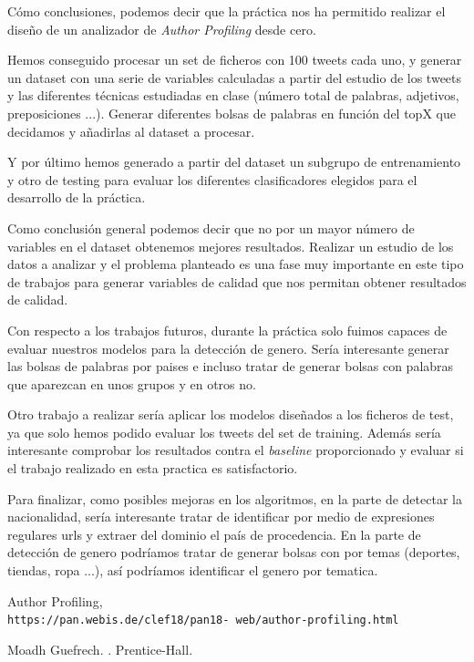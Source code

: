 \documentclass[11pt,a4paper]{article}
\begin{document}
Cómo conclusiones, podemos decir que la práctica nos ha permitido realizar el diseño de un analizador de \textit{Author Profiling} desde cero. 

Hemos conseguido procesar un set de ficheros con 100 tweets cada uno, y generar un dataset con una serie de variables calculadas a partir del estudio de los tweets y las diferentes técnicas estudiadas en clase (número total de palabras, adjetivos, preposiciones ...). Generar diferentes bolsas de palabras en función del topX que decidamos y añadirlas al dataset a procesar. 

Y por último hemos generado a partir del dataset un subgrupo de entrenamiento y otro de testing para evaluar los diferentes clasificadores elegidos para el desarrollo de la práctica.

Como conclusión general podemos decir que no por un mayor número de variables en el dataset obtenemos mejores resultados. Realizar un estudio de los datos a analizar y el problema planteado es una fase muy importante en este tipo de trabajos para generar variables de calidad que nos permitan obtener resultados de calidad.

Con respecto a los trabajos futuros, durante la práctica solo fuimos capaces de evaluar nuestros modelos para la detección de genero. Sería interesante generar las bolsas de palabras por paises e incluso tratar de generar bolsas con palabras que aparezcan en unos grupos y en otros no.

Otro trabajo a realizar sería aplicar los modelos diseñados a los ficheros de test, ya que solo hemos podido evaluar los tweets del set de training. Además sería interesante comprobar los resultados contra el \textit{baseline} proporcionado y evaluar si el trabajo realizado en esta practica es satisfactorio.

Para finalizar, como posibles mejoras en los algoritmos, en la parte de detectar la nacionalidad, sería interesante tratar de identificar por medio de expresiones regulares urls y extraer del dominio el país de procedencia. En la parte de detección de genero podríamos tratar de generar bolsas con por temas (deportes, tiendas, ropa ...), así podríamos identificar el genero por tematica. 

\begin{thebibliography}{}

Author Profiling,
\\\texttt{https://pan.webis.de/clef18/pan18-
web/author-profiling.html}


Moadh Guefrech.
.
\newblock Prentice-{Hall}.

\end{thebibliography}
\end{document}
